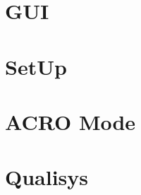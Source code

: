 \documentclass[3p,times]{article}
\begin{document}
	
	\section{GUI}
		
	
	\newpage
		
	
	\newpage
	\section{SetUp}
		
	
	\newpage
	\section{ACRO Mode}
	
	
	\newpage
	\section{Qualisys}
	
	
	\newpage
	
	
%	
	
	\clearpage
		
\end{document}
